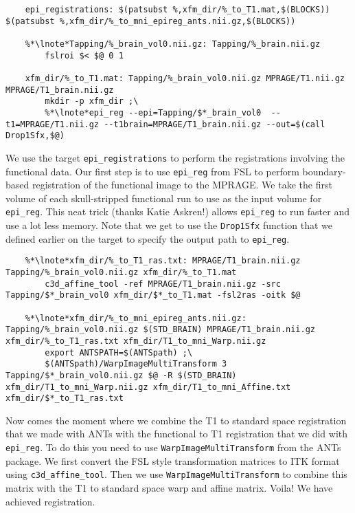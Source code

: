 \begin{lstlisting}
	epi_registrations: $(patsubst %,xfm_dir/%_to_T1.mat,$(BLOCKS)) $(patsubst %,xfm_dir/%_to_mni_epireg_ants.nii.gz,$(BLOCKS))

	%*\lnote*Tapping/%_brain_vol0.nii.gz: Tapping/%_brain.nii.gz
		fslroi $< $@ 0 1

	xfm_dir/%_to_T1.mat: Tapping/%_brain_vol0.nii.gz MPRAGE/T1.nii.gz MPRAGE/T1_brain.nii.gz
		mkdir -p xfm_dir ;\
		%*\lnote*epi_reg --epi=Tapping/$*_brain_vol0  --t1=MPRAGE/T1.nii.gz --t1brain=MPRAGE/T1_brain.nii.gz --out=$(call Drop1Sfx,$@)
\end{lstlisting}
We use the target \texttt{epi_registrations} to perform the
registrations involving the functional data. Our first step is to use
\texttt{epi_reg} from FSL to perform boundary-based registration of
the functional image to the MPRAGE. \lnum{8} We take the
first volume of each skull-stripped functional run to use as the input
volume for \texttt{epi_reg}. This neat trick (thanks Katie Askren!)
allows \texttt{epi_reg} to run faster and use a lot less
memory.  Note that we get to use the \texttt{Drop1Sfx}
function that we defined earlier on the target to specify the output
path to \texttt{epi_reg}.


\begin{lstlisting}
	%*\lnote*xfm_dir/%_to_T1_ras.txt: MPRAGE/T1_brain.nii.gz Tapping/%_brain_vol0.nii.gz xfm_dir/%_to_T1.mat
		c3d_affine_tool -ref MPRAGE/T1_brain.nii.gz -src Tapping/$*_brain_vol0 xfm_dir/$*_to_T1.mat -fsl2ras -oitk $@

	%*\lnote*xfm_dir/%_to_mni_epireg_ants.nii.gz: Tapping/%_brain_vol0.nii.gz $(STD_BRAIN) MPRAGE/T1_brain.nii.gz xfm_dir/%_to_T1_ras.txt xfm_dir/T1_to_mni_Warp.nii.gz
		export ANTSPATH=$(ANTSpath) ;\
		$(ANTSpath)/WarpImageMultiTransform 3 Tapping/$*_brain_vol0.nii.gz $@ -R $(STD_BRAIN) xfm_dir/T1_to_mni_Warp.nii.gz xfm_dir/T1_to_mni_Affine.txt xfm_dir/$*_to_T1_ras.txt
\end{lstlisting}
Now comes the moment where we combine the T1 to standard space
registration that we made with ANTs with the functional to T1
registration that we did with \texttt{epi_reg}. To do this you need to
use \texttt{WarpImageMultiTransform} from the ANTs
package. \lnum{10} We first convert the FSL style transformation matrices to ITK
format using \texttt{c3d_affine_tool}. \lnum{11} Then we use
\texttt{WarpImageMultiTransform} to combine this matrix with the T1 to
standard space warp and affine matrix. Voila! We have achieved
registration. 

